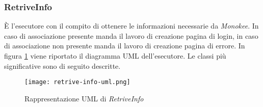 \subsubsection{RetriveInfo}
È l’esecutore con il compito di ottenere le informazioni necessarie da \emph{Monokee}. In caso di associazione presente manda il lavoro di creazione pagina di login, in caso di associazione non presente manda il lavoro di creazione pagina di errore.
In figura \ref{fig:retrive-info-uml-diag} viene riportato il diagramma UML dell'esecutore. Le classi più significative sono di seguito descritte.
\begin{figure}[htbp]
    \centering
    \texttt{[image: retrive-info-uml.png]} 
    \caption{Rappresentazione UML di \emph{RetriveInfo}}
    \label{fig:retrive-info-uml-diag} 
\end{figure}
